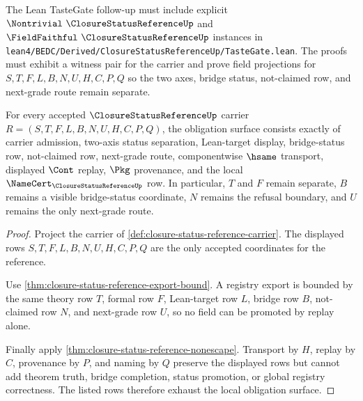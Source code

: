 

The Lean TasteGate follow-up must include explicit $\Nontrivial\ \ClosureStatusReferenceUp$ and $\FieldFaithful\ \ClosureStatusReferenceUp$ instances in \texttt{lean4/BEDC/Derived/ClosureStatusReferenceUp/TasteGate.lean}. The proofs must exhibit a witness pair for the carrier and prove field projections for $S,T,F,L,B,N,U,H,C,P,Q$ so the two axes, bridge status, not-claimed row, and next-grade route remain separate.

\begin{theorem}
\label{thm:closure-status-reference-obligation-surface}
For every accepted $\ClosureStatusReferenceUp$ carrier $R=(S,T,F,L,B,N,U,H,C,P,Q)$, the obligation surface consists exactly of carrier admission, two-axis status separation, Lean-target display, bridge-status row, not-claimed row, next-grade route, componentwise $\hsame$ transport, displayed $\Cont$ replay, $\Pkg$ provenance, and the local $\NameCert_{\ClosureStatusReferenceUp}$ row. In particular, $T$ and $F$ remain separate, $B$ remains a visible bridge-status coordinate, $N$ remains the refusal boundary, and $U$ remains the only next-grade route.
\end{theorem}
\begin{proof}
Project the carrier of \autoref{def:closure-status-reference-carrier}. The displayed rows $S,T,F,L,B,N,U,H,C,P,Q$ are the only accepted coordinates for the reference.

Use \autoref{thm:closure-status-reference-export-bound}. A registry export is bounded by the same theory row $T$, formal row $F$, Lean-target row $L$, bridge row $B$, not-claimed row $N$, and next-grade row $U$, so no field can be promoted by replay alone.

Finally apply \autoref{thm:closure-status-reference-nonescape}. Transport by $H$, replay by $C$, provenance by $P$, and naming by $Q$ preserve the displayed rows but cannot add theorem truth, bridge completion, status promotion, or global registry correctness. The listed rows therefore exhaust the local obligation surface.
\end{proof}

